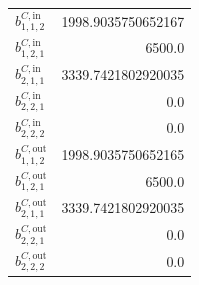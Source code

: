 \documentclass{article}%
\begin{document}
\begin{multicols*}{3}
\begin{supertabular}{lr}
	$b_{1,1,2}^{C,\text{in}}$ & 1998.9035750652167 \\%
	$b_{1,2,1}^{C,\text{in}}$ & 6500.0 \\%
	$b_{2,1,1}^{C,\text{in}}$ & 3339.7421802920035 \\%
	$b_{2,2,1}^{C,\text{in}}$ & 0.0 \\%
	$b_{2,2,2}^{C,\text{in}}$ & 0.0 \\%
	$b_{1,1,2}^{C,\text{out}}$ & 1998.9035750652165 \\%
	$b_{1,2,1}^{C,\text{out}}$ & 6500.0 \\%
	$b_{2,1,1}^{C,\text{out}}$ & 3339.7421802920035 \\%
	$b_{2,2,1}^{C,\text{out}}$ & 0.0 \\%
	$b_{2,2,2}^{C,\text{out}}$ & 0.0 \\%
\end{supertabular}%
\end{multicols*}%
\end{document}

